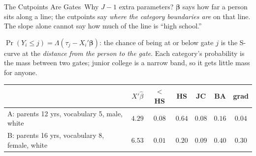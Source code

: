 \documentclass[aspectratio=169,11pt,xcolor=dvipsnames]{beamer}
\newcommand{\core}{\,\raisebox{0.6pt}{\textcolor{corestar}{$\bigstar$}}}
\begin{document}
\begin{frame}{The Cutpoints Are Gates\core}
Why $J - 1$ extra parameters? $\bm\beta$ says how far a person sits along
a line; the cutpoints say \emph{where the category boundaries are} on
that line. The slope alone cannot say how much of the line is ``high
school.''
\begin{center}
\end{center}
\vskip-4pt
$\Pr(Y_i \le j) = \Lambda(\tau_j - X_i'\bm\beta)$: the chance of being at
or below gate $j$ is the S-curve at the \emph{distance from the person to
the gate}. Each category's probability is the mass between two gates;
junior college is a narrow band, so it gets little mass for anyone.
\begin{center}\footnotesize
\renewcommand{\arraystretch}{1.0}
\begin{tabular}{lcccccc}
\toprule
 & $X'\hat\beta$ & $<$HS & HS & JC & BA & grad \\
\midrule
A: parents 12 yrs, vocabulary 5, male, white & $4.29$ & $0.08$ & $0.64$ & $0.08$ & $0.16$ & $0.04$ \\
B: parents 16 yrs, vocabulary 8, female, white & $6.53$ & $0.01$ & $0.20$ & $0.09$ & $0.40$ & $0.30$ \\
\bottomrule
\end{tabular}
\end{center}
\end{frame}
\end{document}
